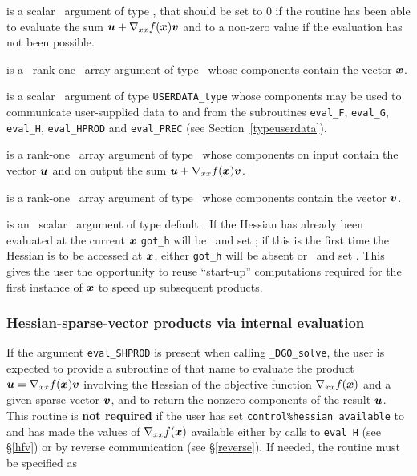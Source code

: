 \documentclass{galahad}
\newcommand{\packagename}{DGO}
\newcommand{\fullpackagename}{\libraryname\_\packagename}
\newcommand{\solver}{{\tt \fullpackagename\_solve}}
\begin{document}
\begin{description}
 is a scalar \intentout\ argument of type \integer,
that should be set to 0 if the routine has been able to evaluate the
sum ${\bm{u}} + \nabla_{xx} f({\bm{x}}) {\bm{v}}$
and to a non-zero value if the evaluation has not been possible.

 is a \ rank-one \intentin\ array argument of type
\realdp\ whose components contain the vector ${\bm{x}}$.

 is a scalar \intentinout\ argument of type
{\tt USERDATA\_type} whose components may be used
to communicate user-supplied data to and from the
subroutines {\tt eval\_F}, {\tt eval\_G},
{\tt eval\_H}, {\tt eval\_HPROD} and {\tt eval\_PREC}
(see Section~\ref{typeuserdata}).

 is a rank-one \intentinout\ array argument of type \realdp\
whose components on input contain the vector ${\bm{u}}$ and on output the
sum ${\bm{u}} + \nabla_{xx} f({\bm{x}}) {\bm{v}}$.

 is a rank-one \intentin\ array argument of type \realdp\
whose components contain the vector ${\bm{v}}$.

 is an \optional\ scalar \intentin\ argument of type default
\logical. If the Hessian has already been evaluated at the current ${\bm{x}}$
{\tt got\_h} will be \present\ and set \true; if this is the first time
the Hessian is to be accessed at ${\bm{x}}$, either {\tt got\_h} will be absent
or \present\ and set \false. This gives the user the opportunity
to reuse ``start-up'' computations required for the first instance of
${\bm{x}}$ to speed up subsequent products.

\end{description}


\subsubsection{Hessian-sparse-vector products via internal evaluation\label{hvsv}}

If the argument {\tt eval\_SHPROD} is present when calling \solver, the
user is expected to provide a subroutine of that name to evaluate the
product ${\bm{u}} = \nabla_{xx} f({\bm{x}}) {\bm{v}}$ involving 
the Hessian of the objective function $\nabla_{xx} f({\bm{x}})$
and a given sparse vector ${\bm{v}}$, and to return the nonzero components 
of the result ${\bm{u}}$. 
This routine is {\bf not required} if the user has set 
{\tt control\%hessian\_available} to \true\, and has made 
the values of $\nabla_{xx} f({\bm{x}})$ available either by calls to 
{\tt eval\_H} (see \S\ref{hfv})
or by reverse communication (see \S\ref{reverse}).
If needed, the routine must be specified as
\end{document}
